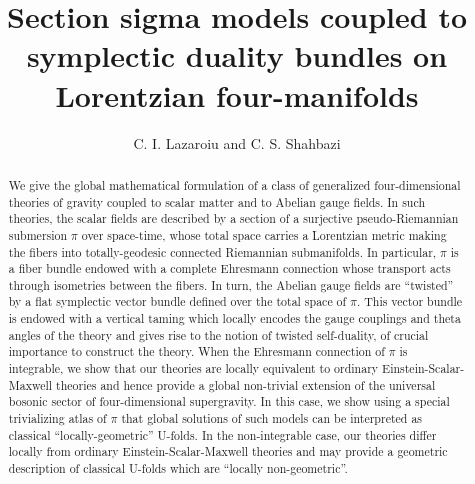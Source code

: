 \documentclass[10pt, cmp, numbook, final, a4paper]{svjour}
\begin{document}
\title{Section sigma models coupled to symplectic duality bundles on Lorentzian four-manifolds}
  
\author{C. I. Lazaroiu and C. S. Shahbazi}

\date{}

\maketitle


\begin{abstract}
We give the global mathematical formulation of a class of generalized
four-dimensional theories of gravity coupled to scalar matter and to
Abelian gauge fields. In such theories, the scalar fields are
described by a section of a surjective pseudo-Riemannian submersion
$\pi$ over space-time, whose total space carries a Lorentzian metric
making the fibers into totally-geodesic connected Riemannian submanifolds.  In
particular, $\pi$ is a fiber bundle endowed with a complete Ehresmann
connection whose transport acts through isometries between the
fibers. In turn, the Abelian gauge fields are ``twisted'' by a flat
symplectic vector bundle defined over the total space of $\pi$. This
vector bundle is endowed with a vertical taming which locally encodes
the gauge couplings and theta angles of the theory and gives rise to the notion of twisted self-duality, of crucial importance to construct the theory. When the Ehresmann connection of $\pi$ is integrable, we show that our theories are locally equivalent to ordinary Einstein-Scalar-Maxwell theories and
hence provide a global non-trivial extension of the universal bosonic sector of
four-dimensional supergravity. In this case, we show using a special
trivializing atlas of $\pi$ that global solutions of such models can
be interpreted as classical ``locally-geometric'' U-folds. In the
non-integrable case, our theories differ locally from ordinary
Einstein-Scalar-Maxwell theories and may provide a geometric
description of classical U-folds which are ``locally non-geometric''.
\end{abstract}
\end{document}
